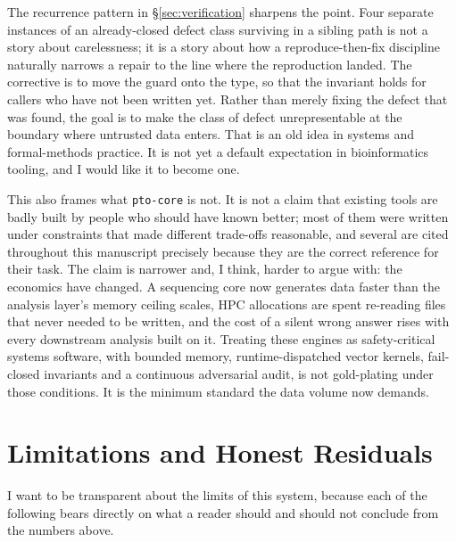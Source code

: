 \documentclass[10pt,twocolumn]{article}
\begin{document}
The recurrence pattern in \S\ref{sec:verification} sharpens the point. Four
separate instances of an already-closed defect class surviving in a sibling
path is not a story about carelessness; it is a story about how a
reproduce-then-fix discipline naturally narrows a repair to the line where
the reproduction landed. The corrective is to move the guard onto the type,
so that the invariant holds for callers who have not been written yet. Rather
than merely fixing the defect that was found, the goal is to make the class
of defect unrepresentable at the boundary where untrusted data enters. That
is an old idea in systems and formal-methods practice. It is not yet a
default expectation in bioinformatics tooling, and I would like it to become
one.

This also frames what \texttt{pto-core} is not. It is not a claim that
existing tools are badly built by people who should have known better; most
of them were written under constraints that made different trade-offs
reasonable, and several are cited throughout this manuscript precisely
because they are the correct reference for their task. The claim is narrower
and, I think, harder to argue with: the economics have changed. A sequencing
core now generates data faster than the analysis layer's memory ceiling
scales, HPC allocations are spent re-reading files that never needed to be
written, and the cost of a silent wrong answer rises with every downstream
analysis built on it. Treating these engines as safety-critical systems
software, with bounded memory, runtime-dispatched vector kernels, fail-closed
invariants and a continuous adversarial audit, is not gold-plating under
those conditions. It is the minimum standard the data volume now demands.

\section{Limitations and Honest Residuals}
\label{sec:limitations}

I want to be transparent about the limits of this system, because each of the
following bears directly on what a reader should and should not conclude from
the numbers above.
\end{document}
